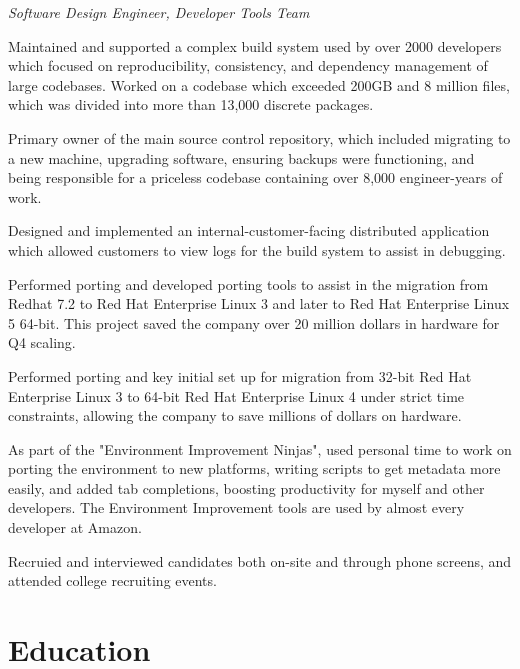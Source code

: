 \documentclass[margin,line]{resume}
\begin{document}
\begin{resume}
	\vspace{1mm} \vspace{1mm}%
	{\sl Software Design Engineer, Developer Tools Team} %
	\begin{list2}
		\vspace*{1mm}
	\item
		Maintained and supported a complex build system used by over 2000 developers
		which focused on reproducibility, consistency, and dependency management of
		large codebases.  Worked on a codebase which exceeded 200GB and 8 million
		files, which was divided into more than 13,000 discrete packages.
	\item
		Primary owner of the main source control repository, which included
		migrating to a new machine, upgrading software, ensuring backups were
		functioning, and being responsible for a priceless codebase containing
		over 8,000 engineer-years of work.
	\item
		Designed and implemented an internal-customer-facing distributed application
		which allowed customers to view logs for the build system to assist in
		debugging.
	\item
		Performed porting and developed porting tools to assist in the migration from
		Redhat 7.2 to Red Hat Enterprise Linux 3 and later to Red Hat
		Enterprise Linux 5 64-bit.  This project saved the company over 20
		million dollars in hardware for Q4 scaling.
	\item
		Performed porting and key initial set up for migration from 32-bit Red Hat
		Enterprise Linux 3 to 64-bit Red Hat Enterprise Linux 4 under strict time
		constraints, allowing the company to save millions of dollars on hardware.
	\item
		As part of the "Environment Improvement Ninjas", used personal time to
		work on porting the environment to new platforms, writing scripts to
		get metadata more easily, and added tab completions, boosting
		productivity for myself and other developers.  The Environment
		Improvement tools are used by almost every developer at Amazon.
	\item
		Recruied and interviewed candidates both on-site and through phone
		screens, and attended college recruiting events.
	\end{list2}

	\section{\mysidestyle Education}


\end{resume}
\end{document}
